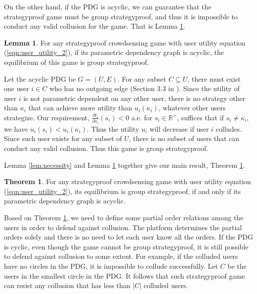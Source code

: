 \documentclass[conference]{IEEEtran}
\theoremstyle{definition}
\newtheorem{theorem}{Theorem}
\newtheorem{lemma}{Lemma}
\begin{document}
On the other hand, if the PDG is acyclic, we can guarantee that the strategyproof game must be group strategyproof, and thus it is impossible to conduct any valid collusion for the game. That is Lemma \ref{lem:sufficiency}.
\begin{lemma}
\label{lem:sufficiency}
For any strategyproof crowdsensing game with user utility equation (\ref{eqn:user_utility_2}), if its parametric dependency graph is acyclic, the  equilibrium of this game is group strategyproof.
\end{lemma}
\begin{IEEEproof}
Let the acyclic PDG be $G=(U,E)$. For any subset $C\subseteq U$, there must exist one user $i\in C$ who has no outgoing edge (Section 3.3 in \cite{dasgupta2006algorithms}). Since the utility of user $i$ is not parametric dependent on any other user, there is no strategy other than $\kappa_i$ that can achieve more utility than $u_i(\kappa_i)$, whatever other users strategize. Our requirement, $\frac{\partial t_i}{\partial s_i}(s_i)<0$ a.e. for $s_i\in\mathbb{R}^+$, suffices that if $s_i\not= \kappa_i$, we have $u_i(s_i)<u_i(\kappa_i)$. Thus the utility $u_i$ will decrease if user $i$ colludes. Since such user exists for any subset of $U$, there is no subset of users that can conduct any valid collusion. Thus this game is group strategyproof.
\end{IEEEproof}

Lemma \ref{lem:necessity} and Lemma \ref{lem:sufficiency} together give our main result, Theorem \ref{thm:main}.
\begin{theorem}
\label{thm:main}
For any strategyproof crowdsensing game with user utility equation (\ref{eqn:user_utility_2}), its equilibrium is group strategyproof, if and only if its parametric dependency graph is acyclic.
\end{theorem}
Based on Theorem \ref{thm:main}, we need to define some partial order relations among the users in order to defend against collusion. The platform determines the partial orders solely and there is no need to let each user know all the orders. If the PDG is cyclic, even though the game cannot be group strategyproof, it is still possible to defend against collusion to some extent. For example, if the colluded users have no circles in the PDG, it is impossible to collude successfully. Let $C$ be the users in the smallest circle in the PDG. It follows that such strategyproof game can resist any collusion that has less than $|C|$ colluded users.
\end{document}
